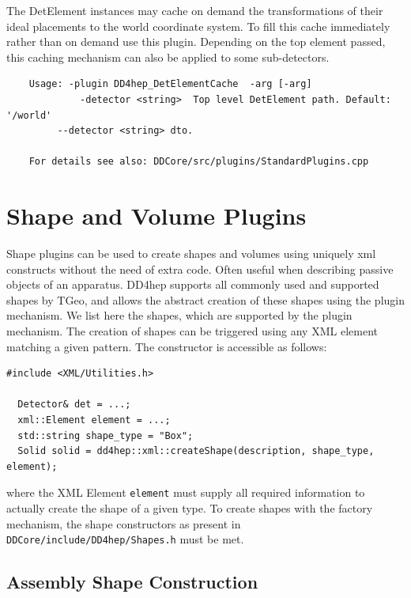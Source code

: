The DetElement instances may cache on demand the transformations of their ideal placements
to the world coordinate system. To fill this cache immediately rather than on demand use this
plugin. Depending on the top element passed, this caching mechanism can also be applied to
some sub-detectors.
\begin{verbatim}
    Usage: -plugin DD4hep_DetElementCache  -arg [-arg]                 
             -detector <string>  Top level DetElement path. Default: '/world'
	     --detector <string> dto.                                        

    For details see also: DDCore/src/plugins/StandardPlugins.cpp
\end{verbatim}



\section{Shape and Volume Plugins}
\label{sec:dd4hep-manual-shape-plugins}

Shape plugins can be used to create shapes and volumes using uniquely xml constructs without the
need of extra code. Often useful when describing passive objects of an apparatus.
DD4hep supports all commonly used and supported shapes by TGeo, and allows the abstract creation 
of these shapes using the plugin mechanism. We list here the shapes, which are supported by 
the plugin mechanism. The creation of shapes can be triggered using any XML element matching 
a given pattern. The constructor is accessible as follows:

\begin{verbatim}
#include <XML/Utilities.h>

  Detector& det = ...;
  xml::Element element = ...;
  std::string shape_type = "Box";
  Solid solid = dd4hep::xml::createShape(description, shape_type, element);
\end{verbatim}
where the XML Element \texttt{element} must supply all required information to actually create the 
shape of a given type.
To create shapes with the factory mechanism, the shape constructors as present in 
\texttt{DDCore/include/DD4hep/Shapes.h} must be met.

\subsection{Assembly Shape Construction}
\label{sec:dd4hep-manual-plugin-assembly-shape}

